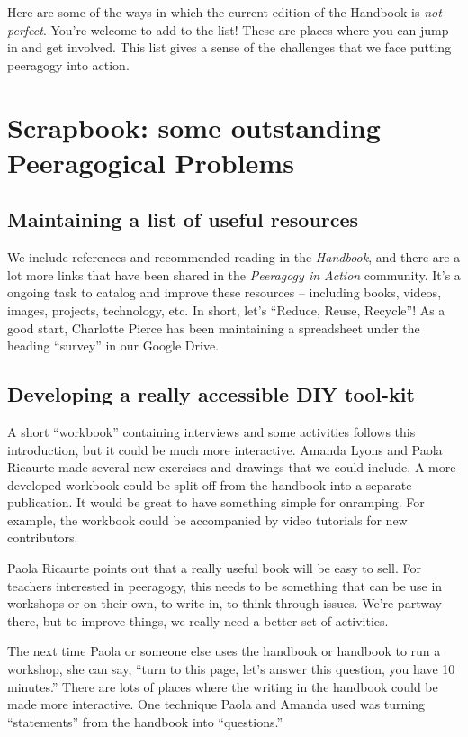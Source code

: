 Here are some of the ways in which the current edition of the Handbook
is \emph{not perfect}. You're welcome to add to the list! These are
places where you can jump in and get involved. This list gives a sense
of the challenges that we face putting peeragogy into action.

\section*{Scrapbook: some outstanding Peeragogical
Problems}\label{scrapbook-some-outstanding-peeragogical-problems}

\subsection{Maintaining a list of useful
resources}\label{maintaining-a-list-of-useful-resources}

We include references and recommended reading in the \emph{Handbook},
and there are a lot more links that have been shared in the
\emph{Peeragogy in Action} community. It's a ongoing task to catalog and
improve these resources -- including books, videos, images, projects,
technology, etc. In short, let's ``Reduce, Reuse, Recycle''! As a good
start, Charlotte Pierce has been maintaining a spreadsheet under the
heading ``survey'' in our Google Drive.

\subsection{Developing a really accessible DIY
tool-kit}\label{developing-a-really-accessible-diy-tool-kit}

A short ``workbook'' containing interviews and some activities follows
this introduction, but it could be much more interactive. Amanda Lyons
and Paola Ricaurte made several new exercises and drawings that we could
include. A more developed workbook could be split off from the handbook
into a separate publication. It would be great to have something simple
for onramping. For example, the workbook could be accompanied by video
tutorials for new contributors.

Paola Ricaurte points out that a really useful book will be easy to
sell. For teachers interested in peeragogy, this needs to be something
that can be use in workshops or on their own, to write in, to think
through issues. We're partway there, but to improve things, we really
need a better set of activities.

The next time Paola or someone else uses the handbook or handbook to run
a workshop, she can say, ``turn to this page, let's answer this
question, you have 10 minutes.'' There are lots of places where the
writing in the handbook could be made more interactive. One technique
Paola and Amanda used was turning ``statements'' from the handbook into
``questions.''

